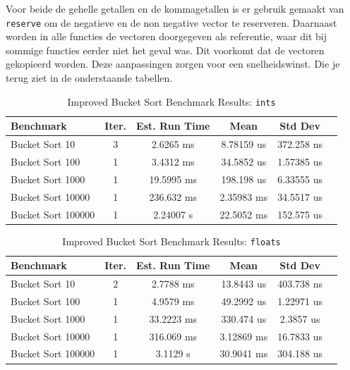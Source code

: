 \documentclass{article}
\begin{document}
Voor beide de gehelle getallen en de kommagetallen is er gebruik gemaakt van \texttt{reserve} om de negatieve en de non negative vector te reserveren. 
Daarnaast worden in alle functies de vectoren doorgegeven als referentie, waar dit bij sommige functies eerder niet het geval was. Dit voorkomt dat de vectoren gekopieerd worden. 
Deze aanpassingen zorgen voor een snelheidswinst. Die je terug ziet in de onderstaande tabellen.

\begin{table}[H]
  \caption{Improved Bucket Sort Benchmark Results:  \texttt{ints}}
  \label{tab:ints-detailed-new}
  \begin{tabular*}{\columnwidth}{@{\extracolsep\fill}lccccc}
    \hline
    Benchmark          & Iter. & Est. Run Time & Mean          & Std Dev       \\
    \hline
    Bucket Sort 10     & 3     & 2.6265 ms    & 8.78159 us    & 372.258 ns  \\
    Bucket Sort 100    & 1     & 3.4312 ms    & 34.5852 us    & 1.57385 us  \\
    Bucket Sort 1000   & 1     & 19.5995 ms   & 198.198 us    & 6.33555 us  \\
    Bucket Sort 10000  & 1     & 236.632 ms   & 2.35983 ms    & 34.5517 us  \\
    Bucket Sort 100000 & 1     & 2.24007 s    & 22.5052 ms    & 152.575 us  \\
    \hline
  \end{tabular*}
\end{table}

\begin{table}[H]
  \caption{Improved Bucket Sort Benchmark Results:  \texttt{floats}}
  \label{tab:floats-detailed-new}
  \begin{tabular*}{\columnwidth}{@{\extracolsep\fill}lccccc}
    \hline
    Benchmark          & Iter. & Est. Run Time & Mean          & Std Dev       \\
    \hline
    Bucket Sort 10     & 2     & 2.7788 ms    & 13.8443 us    & 403.738 ns  \\
    Bucket Sort 100    & 1     & 4.9579 ms    & 49.2992 us    & 1.22971 us  \\
    Bucket Sort 1000   & 1     & 33.2223 ms   & 330.474 us    & 2.3857 us   \\
    Bucket Sort 10000  & 1     & 316.069 ms   & 3.12869 ms    & 16.7833 us  \\
    Bucket Sort 100000 & 1     & 3.1129 s     & 30.9041 ms    & 304.188 us  \\
    \hline
  \end{tabular*}
\end{table}
\end{document}
